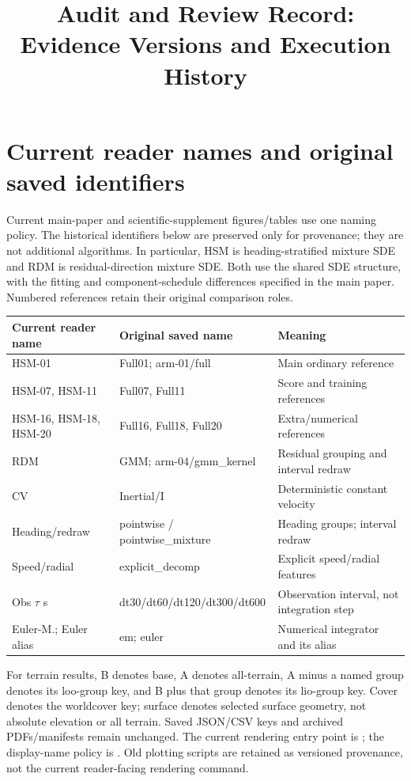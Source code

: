 
\title{Audit and Review Record: Evidence Versions and Execution History}
\maketitle

\section{Current reader names and original saved identifiers}\label{sec:reader-names}
Current main-paper and scientific-supplement figures/tables use one naming
policy. The historical identifiers below are preserved only for provenance;
they are not additional algorithms. In particular, HSM is heading-stratified
mixture SDE and RDM is residual-direction mixture SDE. Both use the shared
SDE structure, with the fitting and component-schedule differences specified
in the main paper. Numbered references retain their original comparison roles.
\begin{center}\small
\begin{tabular}{p{.22\linewidth}p{.40\linewidth}p{.30\linewidth}}\toprule
Current reader name & Original saved name & Meaning\\\midrule
HSM-01 & Full01; arm-01/full & Main ordinary reference\\
HSM-07, HSM-11 & Full07, Full11 & Score and training references\\
HSM-16, HSM-18, HSM-20 & Full16, Full18, Full20 & Extra/numerical references\\
RDM & GMM; arm-04/gmm\_kernel & Residual grouping and interval redraw\\
CV & Inertial/I & Deterministic constant velocity\\
Heading/redraw & pointwise / pointwise\_mixture & Heading groups; interval redraw\\
Speed/radial & explicit\_decomp & Explicit speed/radial features\\
Obs $\tau$ s & dt30/dt60/dt120/dt300/dt600 & Observation interval, not integration step\\
Euler-M.; Euler alias & em; euler & Numerical integrator and its alias\\\bottomrule
\end{tabular}\end{center}
For terrain results, B denotes base, A denotes all-terrain, A minus a named
group denotes its loo-group key, and B plus that group denotes its lio-group
key. Cover denotes the worldcover key; surface denotes selected surface
geometry, not absolute elevation or all terrain. Saved JSON/CSV keys and
archived PDFs/manifests remain unchanged. The current rendering entry point
is ; the display-name policy is
. Old plotting scripts are retained
as versioned provenance, not the current reader-facing rendering command.
